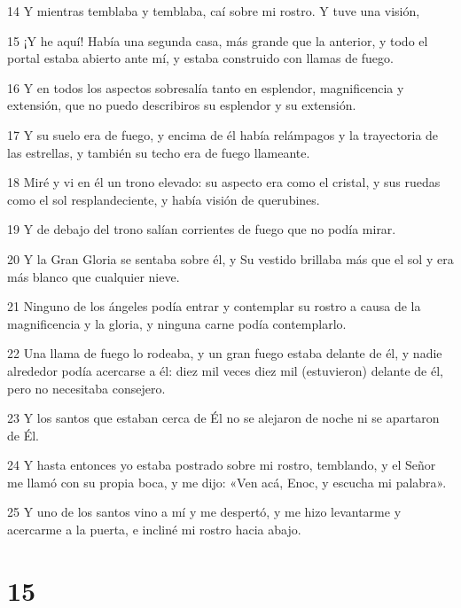 \par 14 Y mientras temblaba y temblaba, caí sobre mi rostro. Y tuve una visión,
\par 15 ¡Y he aquí! Había una segunda casa, más grande que la anterior, y todo el portal estaba abierto ante mí, y estaba construido con llamas de fuego.
\par 16 Y en todos los aspectos sobresalía tanto en esplendor, magnificencia y extensión, que no puedo describiros su esplendor y su extensión.
\par 17 Y su suelo era de fuego, y encima de él había relámpagos y la trayectoria de las estrellas, y también su techo era de fuego llameante.
\par 18 Miré y vi en él un trono elevado: su aspecto era como el cristal, y sus ruedas como el sol resplandeciente, y había visión de querubines.
\par 19 Y de debajo del trono salían corrientes de fuego que no podía mirar.
\par 20 Y la Gran Gloria se sentaba sobre él, y Su vestido brillaba más que el sol y era más blanco que cualquier nieve.
\par 21 Ninguno de los ángeles podía entrar y contemplar su rostro a causa de la magnificencia y la gloria, y ninguna carne podía contemplarlo.
\par 22 Una llama de fuego lo rodeaba, y un gran fuego estaba delante de él, y nadie alrededor podía acercarse a él: diez mil veces diez mil (estuvieron) delante de él, pero no necesitaba consejero.
\par 23 Y los santos que estaban cerca de Él no se alejaron de noche ni se apartaron de Él.
\par 24 Y hasta entonces yo estaba postrado sobre mi rostro, temblando, y el Señor me llamó con su propia boca, y me dijo: «Ven acá, Enoc, y escucha mi palabra».
\par 25 Y uno de los santos vino a mí y me despertó, y me hizo levantarme y acercarme a la puerta, e incliné mi rostro hacia abajo.

\chapter{15}

